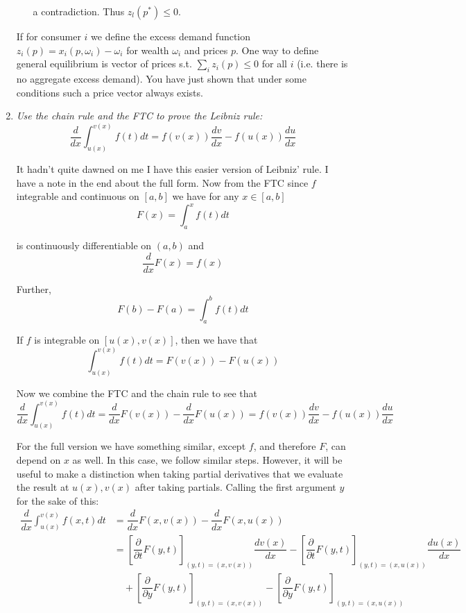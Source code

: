 \documentclass{article}
\begin{document}
\begin{enumerate}[1.]
\begin{enumerate}[a)]
        a contradiction. Thus $z_l(p^*) \le 0$.
    \end{enumerate}

  \begin{remark}
    If for consumer $i$ we define the excess demand function $z_i(p) = x_i(p, \omega_i) - \omega_i$ for wealth $\omega_i$ and prices $p$. One way to define general equilibrium is vector of prices s.t. $\sum^{}_{i} z_i(p) \le 0$ for all $i$ (i.e. there is no aggregate excess demand). You have just shown that under some conditions such a price vector always exists.
  \end{remark}

  \item \textit{Use the chain rule and the FTC to prove the Leibniz rule:}
    \[
      \dfrac{d}{dx} \int_{u(x)}^{v(x)} f(t) dt
      =
      f(v(x)) \dfrac{dv}{dx}
      - f(u(x)) \dfrac{du}{dx}
    \]

    \solution It hadn't quite dawned on me I have this easier version of Leibniz' rule. I have a note in the end about the full form. Now from the FTC since $f$ integrable and continuous on $[a, b]$ we have for any $x \in [a, b]$
    \[
      F(x) = \int_{a}^{x} f(t) dt
    \]

    is continuously differentiable on $(a, b)$ and
    \[
      \dfrac{d}{dx} F(x) = f(x)
    \]

    Further,
    \[
      F(b) - F(a) = \int_{a}^{b} f(t) dt
    \]

    If $f$ is integrable on $[u(x), v(x)]$, then we have that
    \[
      \int_{u(x)}^{v(x)} f(t) dt
      =
      F(v(x)) - F(u(x))
    \]

    Now we combine the FTC and the chain rule to see that
    \[
      \dfrac{d}{dx} \int_{u(x)}^{v(x)} f(t) dt
      =
      \dfrac{d}{dx} F(v(x)) - \dfrac{d}{dx} F(u(x))
      =
      f(v(x)) \dfrac{dv}{dx} - f(u(x)) \dfrac{du}{dx}
    \]

    For the full version we have something similar, except $f$, and therefore $F$, can depend on $x$ as well. In this case, we follow similar steps. However, it will be useful to make a distinction when taking partial derivatives that we evaluate the result at $u(x), v(x)$ after taking partials. Calling the first argument $y$ for the sake of this:
    \begin{align*}
      \dfrac{d}{dx} \int_{u(x)}^{v(x)} f(x, t) dt
      &
      =
      \dfrac{d}{dx}
      F(x, v(x))
      -
      \dfrac{d}{dx}
      F(x, u(x))
      \\
      &
      =
      \left[
        \dfrac{\partial}{\partial t} F(y, t)
      \right]_{(y, t) = (x, v(x))}
      \dfrac{dv(x)}{dx}
      -
      \left[
        \dfrac{\partial}{\partial t} F(y, t)
      \right]_{(y, t) = (x, u(x))}
      \dfrac{du(x)}{dx}
      \\
      &
      \quad
      +
      \left[
        \dfrac{\partial}{\partial y}
        F(y, t)
      \right]_{(y, t) = (x, v(x))}
      -
      \left[
        \dfrac{\partial}{\partial y}
        F(y, t)
      \right]_{(y, t) = (x, u(x))}
    \end{align*}


\end{enumerate}
\end{document}
